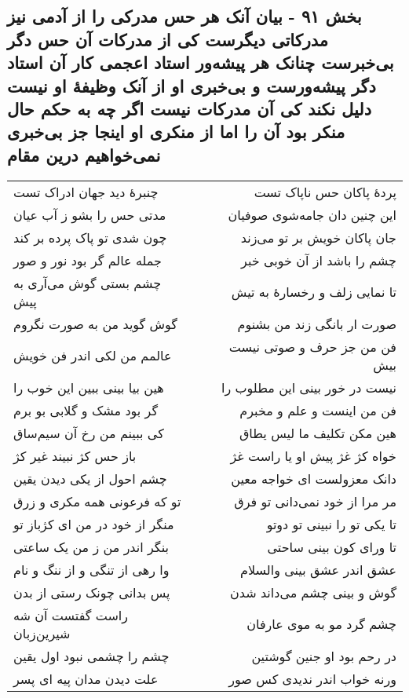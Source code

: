 \begin{center}
\section*{بخش ۹۱ - بیان آنک هر حس مدرکی را از آدمی نیز مدرکاتی دیگرست کی از مدرکات آن  حس دگر بی‌خبرست چنانک هر پیشه‌ور استاد اعجمی کار آن استاد دگر پیشه‌ورست و بی‌خبری او از آنک وظیفهٔ او نیست دلیل نکند کی آن مدرکات نیست  اگر چه به حکم حال منکر بود آن را اما از منکری او اینجا جز بی‌خبری  نمی‌خواهیم درین مقام}
\label{sec:sh091}
\begin{longtable}{l p{0.5cm} r}
چنبرهٔ دید جهان ادراک تست
&&
پردهٔ پاکان حس ناپاک تست
\\
مدتی حس را بشو ز آب عیان
&&
این چنین دان جامه‌شوی صوفیان
\\
چون شدی تو پاک پرده بر کند
&&
جان پاکان خویش بر تو می‌زند
\\
جمله عالم گر بود نور و صور
&&
چشم را باشد از آن خوبی خبر
\\
چشم بستی گوش می‌آری به پیش
&&
تا نمایی زلف و رخسارهٔ به تیش
\\
گوش گوید من به صورت نگروم
&&
صورت ار بانگی زند من بشنوم
\\
عالمم من لکی اندر فن خویش
&&
فن من جز حرف و صوتی نیست بیش
\\
هین بیا بینی ببین این خوب را
&&
نیست در خور بینی این مطلوب را
\\
گر بود مشک و گلابی بو برم
&&
فن من اینست و علم و مخبرم
\\
کی ببینم من رخ آن سیم‌ساق
&&
هین مکن تکلیف ما لیس یطاق
\\
باز حس کژ نبیند غیر کژ
&&
خواه کژ غژ پیش او یا راست غژ
\\
چشم احول از یکی دیدن یقین
&&
دانک معزولست ای خواجه معین
\\
تو که فرعونی همه مکری و زرق
&&
مر مرا از خود نمی‌دانی تو فرق
\\
منگر از خود در من ای کژباز تو
&&
تا یکی تو را نبینی تو دوتو
\\
بنگر اندر من ز من یک ساعتی
&&
تا ورای کون بینی ساحتی
\\
وا رهی از تنگی و از ننگ و نام
&&
عشق اندر عشق بینی والسلام
\\
پس بدانی چونک رستی از بدن
&&
گوش و بینی چشم می‌داند شدن
\\
راست گفتست آن شه شیرین‌زبان
&&
چشم گرد مو به موی عارفان
\\
چشم را چشمی نبود اول یقین
&&
در رحم بود او جنین گوشتین
\\
علت دیدن مدان پیه ای پسر
&&
ورنه خواب اندر ندیدی کس صور

\end{longtable}
\end{center}
